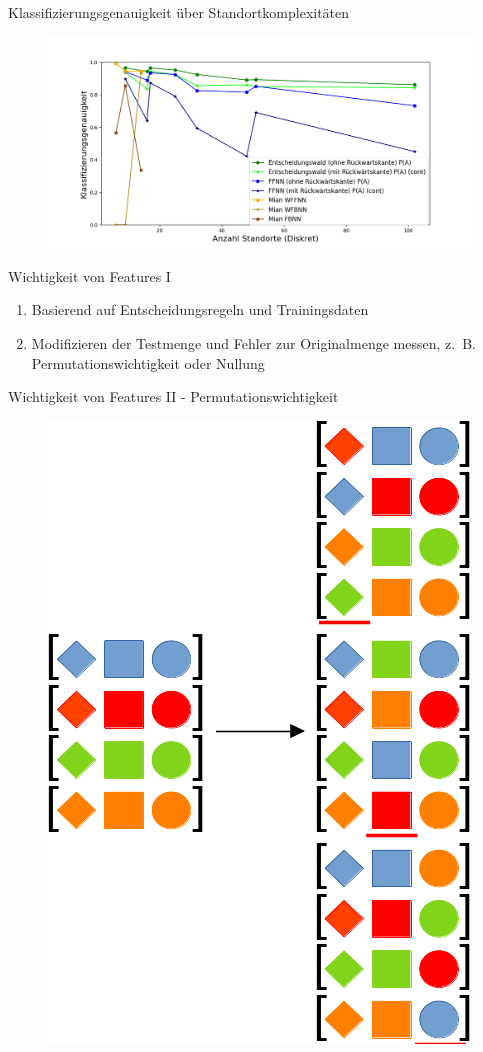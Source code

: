 \documentclass[10pt]{beamer}
\begin{document}
\begin{frame}{Klassifizierungsgenauigkeit über Standortkomplexitäten}
    \begin{figure}
        \centering
        \includegraphics[width=\linewidth]{location_recognition/best_dt_vs_knn_fb_vs_no_fb.png}
    \end{figure}
\end{frame}

\begin{frame}{Wichtigkeit von Features I}
    \begin{enumerate}
        \item Basierend auf Entscheidungsregeln und Trainingsdaten
        \item Modifizieren der Testmenge und Fehler zur Originalmenge messen, z.~B. Permutationswichtigkeit oder Nullung
    \end{enumerate}
\end{frame}

\begin{frame}{Wichtigkeit von Features II - Permutationswichtigkeit}
    \begin{figure}
        \centering
        \includegraphics[width=0.46\linewidth]{model/permutatation_importance.png}
    \end{figure}
\end{frame}
\end{document}
